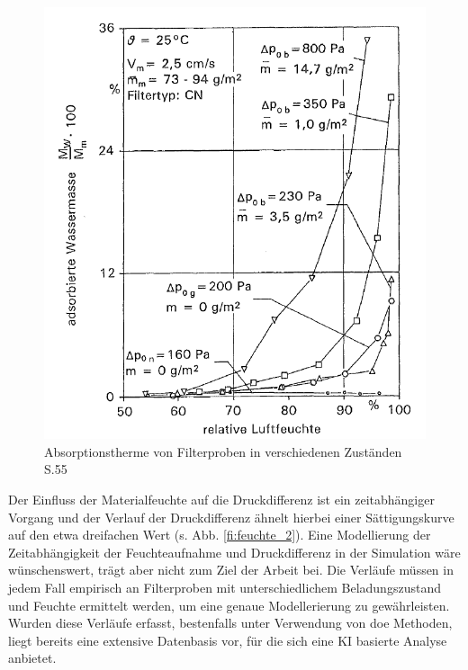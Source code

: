 \begin{figure}[H]
    \begin{center}
        \includegraphics[width=0.95\linewidth]{images/feuchte_1.png}
        \caption[Materialfeuchte rel. Luftfeuchte]{Absorptionstherme von Filterproben in verschiedenen Zuständen \cite{feuchte} S.55}
        \label{fi:feuchte_1}
    \end{center}
\end{figure}
   Der Einfluss der Materialfeuchte auf die Druckdifferenz ist ein zeitabhängiger Vorgang und der Verlauf der Druckdifferenz ähnelt hierbei einer Sättigungskurve auf den etwa dreifachen Wert (s. Abb. \ref{fi:feuchte_2}). Eine Modellierung der Zeitabhängigkeit der Feuchteaufnahme und Druckdifferenz in der Simulation wäre wünschenswert, trägt aber nicht zum Ziel der Arbeit bei. Die Verläufe müssen in jedem Fall empirisch an Filterproben mit unterschiedlichem Beladungszustand und Feuchte ermittelt werden, um eine genaue Modellerierung zu gewährleisten. Wurden diese Verläufe erfasst, bestenfalls unter Verwendung von \ac{doe} Methoden, liegt bereits eine extensive Datenbasis vor, für die sich eine KI basierte Analyse anbietet. 
